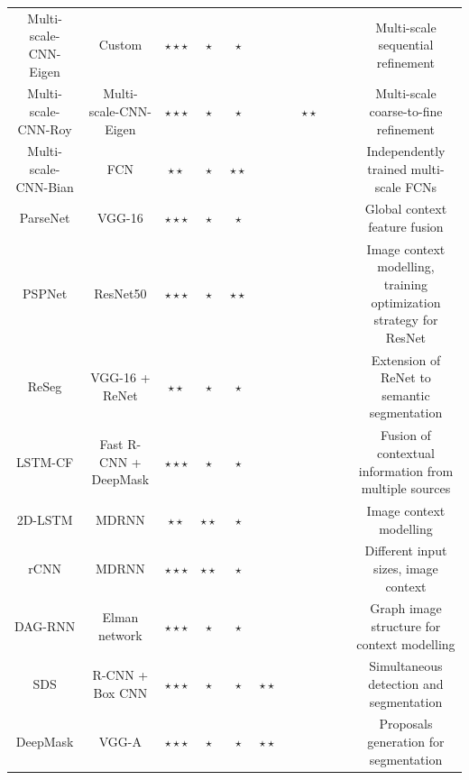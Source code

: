 \begin{table}[!b]
{\begin{tabular}{|c|c|c|c|c|c|c|c|c|c|c|}
		Multi-scale-CNN-Eigen\cite{Eigen2015} & Custom & $\star\star\star$ & $\star$ & $\star$ & \xmark & \xmark & \xmark & \xmark & \cmark & Multi-scale sequential refinement\\
		Multi-scale-CNN-Roy\cite{Roy2016} & Multi-scale-CNN-Eigen & $\star\star\star$ & $\star$ & $\star$ & \xmark & \xmark & $\star\star$ & \xmark & \xmark & Multi-scale coarse-to-fine refinement\\
		Multi-scale-CNN-Bian\cite{Bian2016} & \acs{FCN} & $\star\star$ & $\star$ & $\star\star$ & \xmark & \xmark & \xmark & \xmark & \xmark & Independently trained multi-scale \acsp{FCN}\\
		ParseNet\cite{Liu2015} & \acs{VGG}-16 & $\star\star\star$ & $\star$ & $\star$ & \xmark & \xmark & \xmark & \xmark  & \cmark & Global context feature fusion\\ 
		\acs{PSPNet} \cite{Zhao2016} & ResNet50 & $\star\star\star$ & $\star$ & $\star\star$ & \xmark & \xmark & \xmark & \xmark & \cmark & Image context modelling, training optimization strategy for ResNet\\
		ReSeg\cite{Visin2016} & \acs{VGG}-16 + ReNet & $\star\star$ & $\star$ & $\star$ & \xmark & \xmark & \xmark & \xmark & \cmark & Extension of ReNet to semantic segmentation\\
		\acs{LSTM-CF}\cite{Li2016b} & Fast R-CNN + DeepMask & $\star\star\star$ & $\star$ & $\star$ & \xmark & \xmark & \xmark & \xmark & \cmark & Fusion of contextual information from multiple sources\\
		2D-LSTM\cite{Byeon2015} & \acs{MDRNN} & $\star\star$ & $\star\star$ & $\star$ & \xmark & \xmark & \xmark & \xmark & \xmark & Image context modelling\\
		rCNN\cite{Pinheiro2014} & \acs{MDRNN} & $\star\star\star$ & $\star\star$ & $\star$ & \xmark & \xmark & \xmark & \xmark & \cmark & Different input sizes, image context\\
		DAG-RNN\cite{Shuai2015} & Elman network & $\star\star\star$ & $\star$ & $\star$ & \xmark & \xmark & \xmark & \xmark & \cmark & Graph image structure for context modelling\\
		\acs{SDS}\cite{Hariharan2014} & \acs{R-CNN} + Box \acs{CNN} & $\star\star\star$ & $\star$ & $\star$ & $\star\star$ & \xmark & \xmark & \xmark  & \cmark & Simultaneous detection and segmentation\\
		DeepMask\cite{Pinheiro2015} & \acs{VGG}-A & $\star\star\star$ & $\star$ & $\star$ & $\star\star$ & \xmark & \xmark & \xmark & \cmark & Proposals generation for segmentation\\

\end{tabular}}
\end{table}
